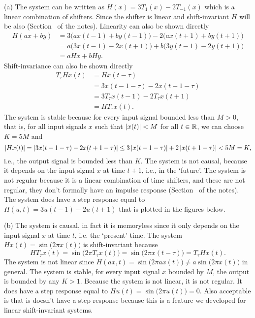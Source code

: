 \begin{excersizelist}
\begin{solution}

(a) The system can be written as $H(x) = 3T_{1}(x) - 2T_{-1}(x)$ which is a linear combination of shifters.  Since the shifter is linear and shift-invariant $H$ will be also (Section~ of the notes).  Linearity can also be shown directly
\begin{align*}
H(ax + by)  &= 3\big( a x(t-1) + by(t-1) \big)  - 2\big( a x(t+1) + by(t+1) \big) \\
&= a\big(3x(t-1)-2x(t+1)\big) + b\big(3y(t-1)-2y(t+1)\big) \\
&= aHx + bHy.
\end{align*}
Shift-invariance can also be shown directly
\begin{align*}
T_\tau Hx(t) &= H x(t-\tau) \\
&= 3x(t-1-\tau)  - 2x(t+1-\tau) \\
&= 3T_\tau x(t-1)  - 2T_\tau x(t+1) \\
&= HT_\tau x(t).
\end{align*}
The system is stable because for every input signal bounded less than $M > 0$, that is, for all input signals $x$ such that $\left\vert x(t) \right\vert < M$ for all $t \in {\mathbb R}$, we can choose $K = 5M$ and
\[
\vert Hx(t) \vert = \vert 3x(t-1-\tau)  - 2x(t+1-\tau) \vert \leq 3\left\vert x(t-1-\tau) \right\vert + 2\left\vert x(t+1-\tau) \right\vert  < 5M = K,
\]
i.e., the output signal is bounded less than $K$.  The system is not causal, because it depends on the input signal $x$ at time $t+1$, i.e., in the `future'.  The system is not regular because it  is a linear combination of time shifters, and these are not regular, they don't formally have an impulse response (Section~ of the notes).  The system does have a step response equal to $H(u,t) = 3u(t-1)  - 2u(t+1)$ that is plotted in the figures below.

(b) The system is causal, in fact it is memoryless since it only depends on the input signal $x$ at time $t$, i.e. the `present' time.  The system $Hx(t) = \sin\big(2\pi x(t)\big)$ is shift-invariant because 
\[
H T_\tau x(t) = \sin\big(2\pi T_\tau x(t)\big) = \sin\big(2\pi x(t-\tau)\big) = T_\tau H x(t).
\]
The system is not linear since $H(ax,t) = \sin\big(2\pi a x(t)\big) \neq a \sin\big(2\pi x(t)\big)$ in general.  The system is stable, for every input signal $x$ bounded by $M$, the output is bounded by any $K > 1$.  Because the system is not linear, it is not regular. It does have a step response equal to $Hu(t) = \sin\big(2\pi u(t)\big) = 0$.  Also acceptable is that is doesn't have a step response because this is a feature we developed for linear shift-invariant systems.


\end{solution}
\end{excersizelist}
